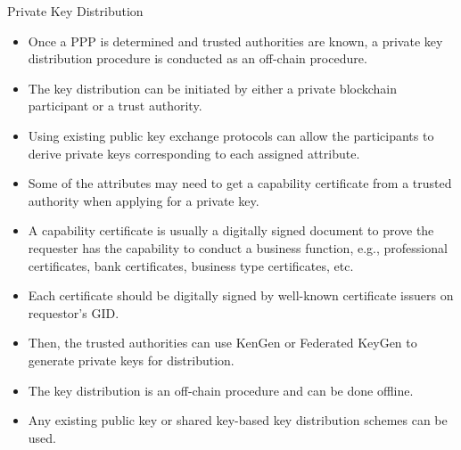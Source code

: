 \documentclass[11pt]{beamer}
\begin{document}
\begin{frame}[allowframebreaks]{Private Key Distribution}

\begin{itemize}

\item Once a PPP is determined and trusted authorities are known, a private key distribution procedure is conducted as an off-chain procedure.
\item The key distribution can be initiated by either a private blockchain participant or a trust authority.
\item  Using existing public key exchange protocols can allow the participants to derive private keys corresponding to each assigned attribute.
\item Some of the attributes may need to get a capability certificate from a trusted authority when applying for a private key.
\item A capability certificate is usually a digitally signed document to prove the requester has the capability to conduct a business function, e.g., professional certificates, bank certificates, business type certificates, etc.
\item  Each certificate should be digitally signed by well-known certificate issuers on requestor’s GID.
\item Then, the trusted authorities can use KenGen or Federated KeyGen to generate private keys for distribution.
\item The key distribution is an off-chain procedure and can be done offline.
\item Any existing public key or shared key-based key distribution schemes can be used.

\end{itemize}

\end{frame}
\end{document}
